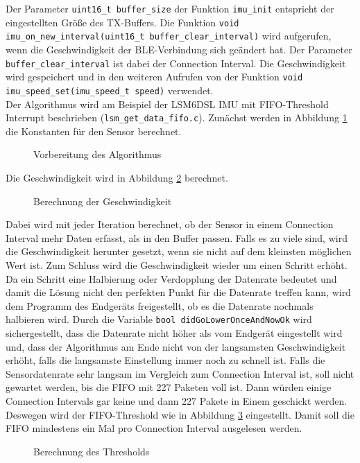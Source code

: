 Der Parameter \texttt{uint16\_t buffer\_size} der Funktion \texttt{imu\_init} entspricht der eingestellten Größe des TX-Buffers.
Die Funktion \texttt{void imu\_on\_new\_interval(\allowbreak{}uint16\_t buffer\_clear\_interval)} wird aufgerufen, wenn die Geschwindigkeit der BLE-Verbindung sich geändert hat.
Der Parameter \texttt{buffer\_clear\_interval} ist dabei der Connection Interval.
Die Geschwindigkeit wird gespeichert und in den weiteren Aufrufen von der Funktion \texttt{void imu\_speed\_set(\allowbreak{}imu\_speed\_t speed)} verwendet.\\
Der Algorithmus wird am Beispiel der LSM6DSL IMU mit FIFO-Threshold Interrupt beschrieben (\texttt{lsm\_get\_data\_fifo.c}).
Zunächst werden in Abbildung \ref{lst:algoPre} die Konstanten für den Sensor berechnet.
\begin{figure}[hbtp]
	
	\caption{Vorbereitung des Algorithmus}
	\label{lst:algoPre}
\end{figure}
Die Geschwindigkeit wird in Abbildung \ref{lst:algo} berechnet.
\begin{figure}[hbtp]
	
	\caption{Berechnung der Geschwindigkeit}
	\label{lst:algo}
\end{figure}
Dabei wird mit jeder Iteration berechnet, ob der Sensor in einem Connection Interval mehr Daten erfasst, als in den Buffer passen.
Falls es zu viele sind, wird die Geschwindigkeit herunter gesetzt, wenn sie nicht auf dem kleinsten möglichen Wert ist.
Zum Schluss wird die Geschwindigkeit wieder um einen Schritt erhöht.
Da ein Schritt eine Halbierung oder Verdopplung der Datenrate bedeutet und damit die Lösung nicht den perfekten Punkt für die Datenrate treffen kann, wird dem Programm des Endgeräts freigestellt, ob es die Datenrate nochmals halbieren wird.
Durch die Variable \texttt{bool didGoLowerOnceAndNowOk} wird sichergestellt, dass die Datenrate nicht höher als vom Endgerät eingestellt wird und, dass der Algorithmus am Ende nicht von der langsamsten Geschwindigkeit erhöht, falls die langsamste Einstellung immer noch zu schnell ist.
Falls die Sensordatenrate sehr langsam im Vergleich zum Connection Interval ist, soll nicht gewartet werden, bis die FIFO mit 227 Paketen voll ist.
Dann würden einige Connection Intervals gar keine und dann 227 Pakete in Einem geschickt werden.
Deswegen wird der FIFO-Threshold wie in Abbildung \ref{lst:algoPost} eingestellt.
Damit soll die FIFO mindestens ein Mal pro Connection Interval ausgelesen werden.
\begin{figure}[hbtp]
	
	\caption{Berechnung des Thresholds}
	\label{lst:algoPost}
\end{figure}\\
